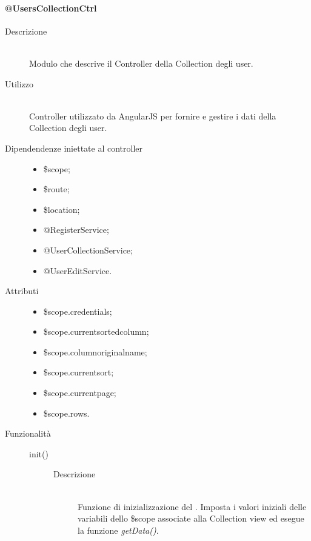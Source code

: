 \paragraph{@UsersCollectionCtrl}
\begin{description}
 \item[Descrizione] \hfill \\
 Modulo che descrive il Controller della Collection degli user.
 
 \item[Utilizzo] \hfill \\
 Controller utilizzato da AngularJS per fornire e gestire i dati della Collection degli user.
 
 \item[Dipendendenze iniettate al controller] \hfill
 \begin{itemize}
  \item \$scope;
  \item \$route;
  \item \$location;
  \item @RegisterService;
  \item @UserCollectionService;
  \item @UserEditService.
 \end{itemize}
 
 \item[Attributi] \hfill
 \begin{itemize}
 \item \$scope.credentials;
 \item \$scope.current\textunderscore sorted\textunderscore column;
 \item \$scope.column\textunderscore original\textunderscore name;
 \item \$scope.current\textunderscore sort;
 \item \$scope.current\textunderscore page;
 \item \$scope.rows.
 \end{itemize}
 
 \item[Funzionalità] \hfill
 \begin{description}
  \item[init()] \hfill
  \begin{description}
   	\item[Descrizione] \hfill \\
  Funzione di inizializzazione del . Imposta i valori iniziali delle variabili dello
  \$scope associate alla Collection view ed esegue la funzione \textit{getData()}.
    \end{description}


\end{description}
\end{description}
